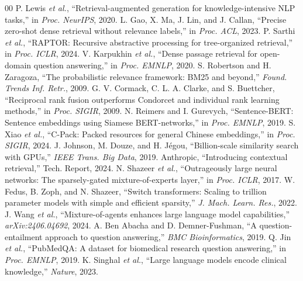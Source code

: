 \documentclass[conference]{IEEEtran}
\begin{document}
\begin{thebibliography}{00}
 P. Lewis \emph{et al.}, ``Retrieval-augmented generation
for knowledge-intensive NLP tasks,'' in \emph{Proc. NeurIPS}, 2020.
 L. Gao, X. Ma, J. Lin, and J. Callan, ``Precise zero-shot
dense retrieval without relevance labels,'' in \emph{Proc. ACL}, 2023.
 P. Sarthi \emph{et al.}, ``RAPTOR: Recursive abstractive
processing for tree-organized retrieval,'' in \emph{Proc. ICLR}, 2024.
 V. Karpukhin \emph{et al.}, ``Dense passage retrieval
for open-domain question answering,'' in \emph{Proc. EMNLP}, 2020.
 S. Robertson and H. Zaragoza, ``The probabilistic
relevance framework: BM25 and beyond,'' \emph{Found. Trends Inf. Retr.}, 2009.
 G. V. Cormack, C. L. A. Clarke, and S. Buettcher,
``Reciprocal rank fusion outperforms Condorcet and individual rank learning
methods,'' in \emph{Proc. SIGIR}, 2009.
 N. Reimers and I. Gurevych, ``Sentence-BERT: Sentence
embeddings using Siamese BERT-networks,'' in \emph{Proc. EMNLP}, 2019.
 S. Xiao \emph{et al.}, ``C-Pack: Packed resources for
general Chinese embeddings,'' in \emph{Proc. SIGIR}, 2024.
 J. Johnson, M. Douze, and H. J\'egou, ``Billion-scale
similarity search with GPUs,'' \emph{IEEE Trans. Big Data}, 2019.
 Anthropic, ``Introducing contextual
retrieval,'' Tech. Report, 2024.
 N. Shazeer \emph{et al.}, ``Outrageously large neural
networks: The sparsely-gated mixture-of-experts layer,'' in \emph{Proc. ICLR},
2017.
 W. Fedus, B. Zoph, and N. Shazeer, ``Switch
transformers: Scaling to trillion parameter models with simple and efficient
sparsity,'' \emph{J. Mach. Learn. Res.}, 2022.
 J. Wang \emph{et al.}, ``Mixture-of-agents enhances large
language model capabilities,'' \emph{arXiv:2406.04692}, 2024.
 A. Ben Abacha and D. Demner-Fushman, ``A
question-entailment approach to question answering,'' \emph{BMC Bioinformatics},
2019.
 Q. Jin \emph{et al.}, ``PubMedQA: A dataset for
biomedical research question answering,'' in \emph{Proc. EMNLP}, 2019.
 K. Singhal \emph{et al.}, ``Large language models
encode clinical knowledge,'' \emph{Nature}, 2023.
\end{thebibliography}
\end{document}
